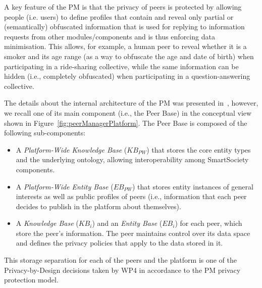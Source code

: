 A key feature of the PM is that the privacy of peers is protected by allowing people (i.e. users) to define profiles that contain and reveal only partial or (semantically) obfuscated information that is used for replying to information requests from other modules/components and is thus enforcing data minimisation. 
This allows, for example, a human peer to reveal whether it is a smoker and its age range (as a way to obfuscate the age and date of birth) when participating in a ride-sharing collective, while the same information can be hidden (i.e., completely obfuscated) when participating in a question-answering collective.

The details about the internal architecture of the PM was presented in~\cite{D4.2,Hartswood:2015fe}, however, we recall one of its main component (i.e., the Peer Base) in the conceptual view shown in Figure~\ref{fig:peerManagerPlatform}. The Peer Base is composed of the following sub-components: 
\begin{itemize}
\item A \emph{Platform-Wide Knowledge Base} (${KB}_{PW}$) that stores the core entity types and the underlying ontology, allowing interoperability among SmartSociety components. 
\item A \emph{Platform-Wide Entity Base} (${EB}_{PW}$) that stores entity instances of general interests as well as public profiles of peers (i.e., information that each peer decides to publish in the platform about themselves).
\item A \emph{Knowledge Base} (${KB}_i$) and an \emph{Entity Base} (${EB}_i$) for each peer, which store the peer’s information. The peer maintains control over its data space and defines the privacy policies that apply to the data stored in it. 
\end{itemize}
This storage separation for each of the peers and the platform is one of the Privacy-by-Design decisions taken by WP4 in accordance to the PM  privacy protection model.
%

